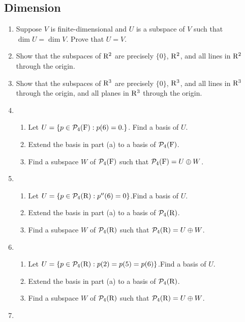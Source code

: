 \subsection{Dimension}
\begin{enumerate}
    \item Suppose $V$ is finite-dimensional and $U$ is a subspace of $V$ such that $\dim{U} = \dim{V}$. Prove that $U = V$.
    \item Show that the subspaces of $\mathrm{R}^2$ are precisely $\{0\}$, $\mathrm{R}^2$, and all lines in $\mathrm{R}^2$ through the origin.
    \item Show that the subspaces of $\mathrm{R}^3$ are precisely $\{0\}$, $\mathrm{R}^3$, and all lines in $\mathrm{R}^3$ through the origin, and all
        planes in $\mathrm{R}^3$ through the origin.
    \item \begin{enumerate}[label=(\alph*)]
            \item Let $U = \{p \in \mathcal{P}_4(\mathrm{F}): p(6)=0.\}$. Find a basis of $U$.
            \item Extend the basis in part (a) to a basis of $\mathcal{P}_4(\mathrm{F})$.
            \item Find a subspace $W$ of $\mathcal{P}_4(\mathrm{F})$ such that $\mathcal{P}_4(\mathrm{F}) = U \oplus W$.
        \end{enumerate}
    \item \begin{enumerate}[label=(\alph*)]
            \item Let $U = \{p \in \mathcal{P}_4(\mathrm{R}):p''(6)=0\}$.Find a basis of $U$.
            \item Extend the basis in part (a) to a basis of $\mathcal{P}_4(\mathrm{R})$.
            \item Find a subspace $W$ of $\mathcal{P}_4(\mathrm{R})$ such that $\mathcal{P}_4(\mathrm{R}) = U \oplus W$.
        \end{enumerate}
    \item \begin{enumerate}[label=(\alph*)]
            \item Let $U = \{p \in \mathcal{P}_4(\mathrm{R}):p(2)=p(5)=p(6)\}$.Find a basis of $U$.
            \item Extend the basis in part (a) to a basis of $\mathcal{P}_4(\mathrm{R})$.
            \item Find a subspace $W$ of $\mathcal{P}_4(\mathrm{R})$ such that $\mathcal{P}_4(\mathrm{R}) = U \oplus W$.
        \end{enumerate}
    \item \begin{enumerate}[label=(\alph*)]

\end{enumerate}
\end{enumerate}
